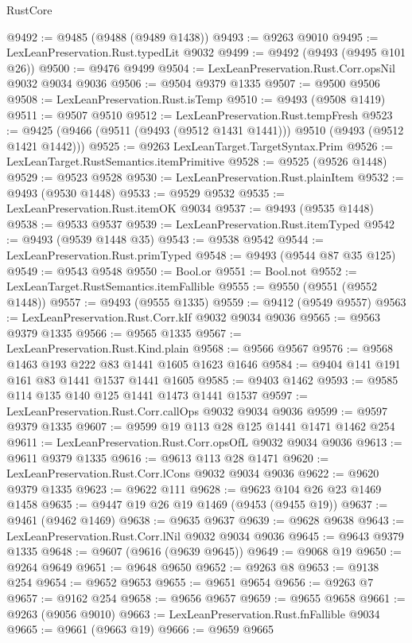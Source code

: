 \begin{lexlean}{RustCore}
\begin{coremodule}
@9492 := @9485 (@9488 (@9489 @1438))
@9493 := @9263 @9010
@9495 := LexLeanPreservation.Rust.typedLit @9032
@9499 := @9492 (@9493 (@9495 @101 @26))
@9500 := @9476 @9499
@9504 := LexLeanPreservation.Rust.Corr.opsNil @9032 @9034 @9036
@9506 := @9504 @9379 @1335
@9507 := @9500 @9506
@9508 := LexLeanPreservation.Rust.isTemp
@9510 := @9493 (@9508 @1419)
@9511 := @9507 @9510
@9512 := LexLeanPreservation.Rust.tempFresh
@9523 := @9425 (@9466 (@9511 (@9493 (@9512 @1431 @1441))) @9510 (@9493 (@9512 @1421 @1442)))
@9525 := @9263 LexLeanTarget.TargetSyntax.Prim
@9526 := LexLeanTarget.RustSemantics.itemPrimitive
@9528 := @9525 (@9526 @1448)
@9529 := @9523 @9528
@9530 := LexLeanPreservation.Rust.plainItem
@9532 := @9493 (@9530 @1448)
@9533 := @9529 @9532
@9535 := LexLeanPreservation.Rust.itemOK @9034
@9537 := @9493 (@9535 @1448)
@9538 := @9533 @9537
@9539 := LexLeanPreservation.Rust.itemTyped
@9542 := @9493 (@9539 @1448 @35)
@9543 := @9538 @9542
@9544 := LexLeanPreservation.Rust.primTyped
@9548 := @9493 (@9544 @87 @35 @125)
@9549 := @9543 @9548
@9550 := Bool.or
@9551 := Bool.not
@9552 := LexLeanTarget.RustSemantics.itemFallible
@9555 := @9550 (@9551 (@9552 @1448))
@9557 := @9493 (@9555 @1335)
@9559 := @9412 (@9549 @9557)
@9563 := LexLeanPreservation.Rust.Corr.kIf @9032 @9034 @9036
@9565 := @9563 @9379 @1335
@9566 := @9565 @1335
@9567 := LexLeanPreservation.Rust.Kind.plain
@9568 := @9566 @9567
@9576 := @9568 @1463 @193 @222 @83 @1441 @1605 @1623 @1646
@9584 := @9404 @141 @191 @161 @83 @1441 @1537 @1441 @1605
@9585 := @9403 @1462
@9593 := @9585 @114 @135 @140 @125 @1441 @1473 @1441 @1537
@9597 := LexLeanPreservation.Rust.Corr.callOps @9032 @9034 @9036
@9599 := @9597 @9379 @1335
@9607 := @9599 @19 @113 @28 @125 @1441 @1471 @1462 @254
@9611 := LexLeanPreservation.Rust.Corr.opsOfL @9032 @9034 @9036
@9613 := @9611 @9379 @1335
@9616 := @9613 @113 @28 @1471
@9620 := LexLeanPreservation.Rust.Corr.lCons @9032 @9034 @9036
@9622 := @9620 @9379 @1335
@9623 := @9622 @111
@9628 := @9623 @104 @26 @23 @1469 @1458
@9635 := @9447 @19 @26 @19 @1469 (@9453 (@9455 @19))
@9637 := @9461 (@9462 @1469)
@9638 := @9635 @9637
@9639 := @9628 @9638
@9643 := LexLeanPreservation.Rust.Corr.lNil @9032 @9034 @9036
@9645 := @9643 @9379 @1335
@9648 := @9607 (@9616 (@9639 @9645))
@9649 := @9068 @19
@9650 := @9264 @9649
@9651 := @9648 @9650
@9652 := @9263 @8
@9653 := @9138 @254
@9654 := @9652 @9653
@9655 := @9651 @9654
@9656 := @9263 @7
@9657 := @9162 @254
@9658 := @9656 @9657
@9659 := @9655 @9658
@9661 := @9263 (@9056 @9010)
@9663 := LexLeanPreservation.Rust.fnFallible @9034
@9665 := @9661 (@9663 @19)
@9666 := @9659 @9665

\end{coremodule}
\end{lexlean}
